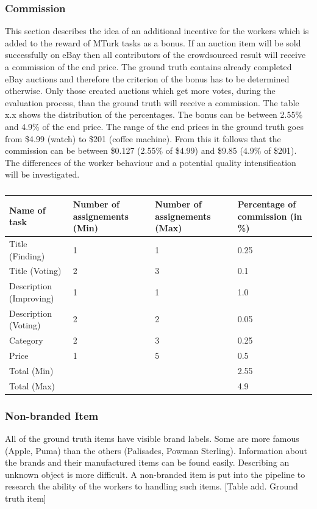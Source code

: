 \subsubsection{Commission}
This section describes the idea of an additional incentive for the workers which is added to the reward of MTurk tasks as a bonus. If an auction item will be sold successfully on eBay then all contributors of the crowdsourced result will receive a commission of the end price. The ground truth contains already completed eBay auctions and therefore the criterion of the bonus has to be determined otherwise. Only those created auctions which get more votes, during the evaluation process, than the ground truth will receive a commission. The table x.x shows the distribution of the percentages. The bonus can be between 2.55\% and 4.9\% of the end price. The range of the end prices in the ground truth goes from \$4.99 (watch) to \$201 (coffee machine). From this it follows that the commission can be between \$0.127 (2.55\% of \$4.99) and \$9.85 (4.9\% of \$201). The differences of the worker behaviour and a potential quality intensification will be investigated. 
\begin{table}[h!]
	\begin{center}
	\begin{tabular}{| l | l | l | p{10cm} |}
		\hline
		Name of task & Number of assignements (Min) & Number of assignements (Max) & Percentage of commission (in \%) \\
		\hline
		Title (Finding) & 1 & 1 & 0.25 \\
		\hline
		Title (Voting) & 2 & 3 & 0.1 \\
		\hline
		Description (Improving) & 1 & 1 & 1.0 \\
		\hline
		Description (Voting) & 2 & 2 & 0.05 \\
		\hline
		Category & 2 & 3 & 0.25 \\
		\hline
		Price & 1 & 5 & 0.5 \\
		\hline
		Total (Min) & & & 2.55 \\
		\hline
		Total (Max) & & & 4.9 \\
		\hline
	\end{tabular}
	\end{center}
	\caption{}
\end{table}

\subsubsection{Non-branded Item}
All of the ground truth items have visible brand labels. Some are more famous (Apple, Puma) than the others (Palisades, Powman Sterling). Information about the brands and their manufactured items can be found easily. Describing an unknown object is more difficult. A non-branded item is put into the pipeline to research the ability of the workers to handling such items. 
[Table add. Ground truth item] 
